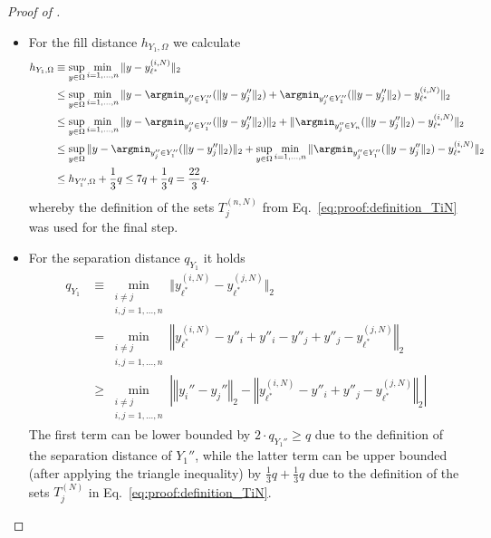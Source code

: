 \documentclass[a4paper, 10pt]{article}
\begin{document}
\begin{proof}[Proof of ]
\begin{itemize}
\item For the fill distance $h_{Y_1, \Omega}$ we calculate
\begin{align}
\label{eq:proof:subset_upper_bound_fill_dist}
h_{Y_1, \Omega} &\equiv \sup_{y \in \Omega} \min_{i=1, ..., n} \Vert y - y_{\ell^*}^{(i, N)} \Vert_2 \notag \\
&\leq \sup_{y \in \Omega} \min_{i=1, ..., n} \Vert y - \argmin_{y_j'' \in Y_1''}(\Vert y - y_j'' \Vert_2) + \argmin_{y_j'' \in Y_1''}(\Vert y - y_j'' \Vert_2) - y_{\ell^*}^{(i,N)} \Vert_2 \notag \\
&\leq \sup_{y \in \Omega} \min_{i=1, ..., n} \Vert y - \argmin_{y_j'' \in Y_1''}(\Vert y - y_j'' \Vert_2) \Vert_2 + \Vert \argmin_{y_j'' \in Y_n}(\Vert y - y_j'' \Vert_2) - y_{\ell^*}^{(i,N)} \Vert_2 \notag \\
&\leq \sup_{y \in \Omega} \Vert y - \argmin_{y_j'' \in Y_1''}(\Vert y - y_j'' \Vert_2) \Vert_2 + \sup_{y \in \Omega} \min_{i=1, ..., n} \Vert \argmin_{y_j'' \in Y_1''}(\Vert y - y_j'' \Vert_2) - y_{\ell^*}^{(i,N)} \Vert_2 \notag \\
&\leq h_{Y_1'', \Omega} + \frac{1}{3} q 
\leq 7q + \frac{1}{3}q = \frac{22}{3}q.
\end{align}
whereby the definition of the sets $T_j^{(n, N)}$ from Eq.\ \eqref{eq:proof:definition_TiN} was used for the final step.
%
%
%
%
%
\item For the separation distance $q_{Y_1}$ it holds
\begin{align*}
q_{Y_1} &\equiv \min_{\substack{i \neq j \\ i, j = 1, ..., n}} \Vert y_{\ell^*}^{(i,N)} - y_{\ell^*}^{(j,N)} \Vert_2 \\
&= \min_{\substack{i \neq j \\ i, j = 1, ..., n}} \left \Vert y_{\ell^*}^{(i,N)} - y''_i + y''_i - y''_j + y''_j - y_{\ell^*}^{(j,N)} \right \Vert_2 \\
&\geq \min_{\substack{i \neq j \\ i, j = 1, ..., n}} \left| \left \Vert y_i'' - y_j'' \right \Vert_2 - \left \Vert y_{\ell^*}^{(i,N)} - y''_i + y''_j - y_{\ell^*}^{(j,N)} \right \Vert_2 \right|
\end{align*}
The first term can be lower bounded by $2 \cdot q_{Y_1''} \geq q$ due to the definition of the separation distance of $Y_1''$, 
while the latter term can be upper bounded (after applying the triangle inequality) by $\frac{1}{3} q + \frac{1}{3} q$ due to the definition of the sets $T_j^{(N)}$ in Eq.\ \eqref{eq:proof:definition_TiN}.

\end{itemize}
\end{proof}
\end{document}
